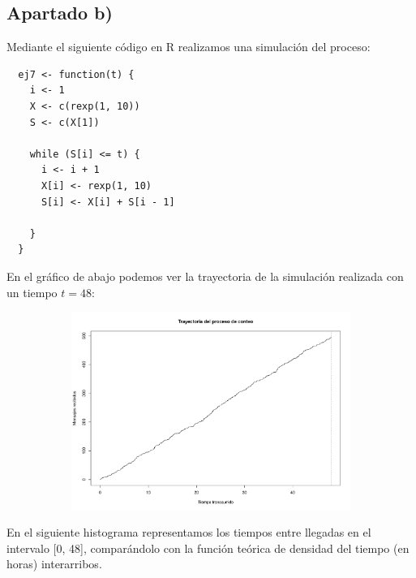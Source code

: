 \documentclass[11pt]{article}
\begin{document}

\newpage

\subsection*{Apartado b)}

Mediante el siguiente código en R realizamos una simulación del proceso:

\begin{verbatim}
  ej7 <- function(t) {
    i <- 1
    X <- c(rexp(1, 10))
    S <- c(X[1])
    
    while (S[i] <= t) {
      i <- i + 1
      X[i] <- rexp(1, 10)
      S[i] <- X[i] + S[i - 1]
      
    }
  }
\end{verbatim}

En el gráfico de abajo podemos ver la trayectoria de la simulación realizada
con un tiempo $t = 48$:

\begin{figure}[h!]
  \begin{center}
    \begin{subfigure}[b]{\linewidth}
      \includegraphics[width=\linewidth]{trayectoriaMensajes.pdf}
    \end{subfigure}
  \end{center}
\end{figure}

En el siguiente histograma representamos los tiempos entre llegadas en el
intervalo [0, 48], comparándolo con la función teórica de densidad del tiempo (en horas)
interarribos.
\end{document}
